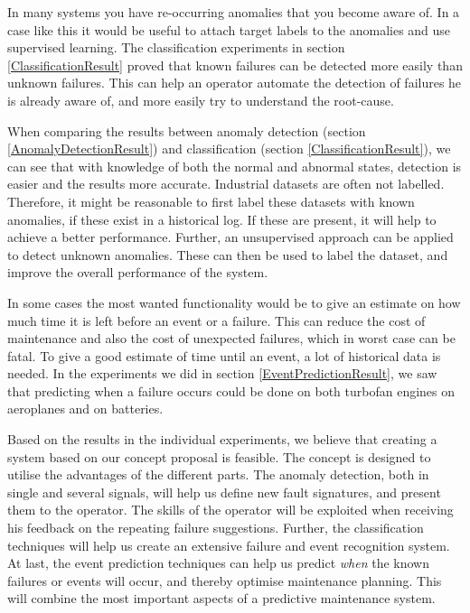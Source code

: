 \documentclass[english, a4paper]{report}
\begin{document}
{{        \par 
        In many systems you have re-occurring anomalies that you become aware of. In a case like this it would be useful to attach target labels to the anomalies and use supervised learning. The classification experiments in section \ref{ClassificationResult} proved that known failures can be detected more easily than unknown failures. This can help an operator automate the detection of failures he is already aware of, and more easily try to understand the root-cause. 
        \par 
        When comparing the results between anomaly detection (section \ref{AnomalyDetectionResult}) and classification (section \ref{ClassificationResult}), we can see that with knowledge of both the normal and abnormal states, detection is easier and the results more accurate. Industrial datasets are often not labelled. Therefore, it might be reasonable to first label these datasets with known anomalies, if these exist in a historical log. If these are present, it will help to achieve a better performance.  Further, an unsupervised approach can be applied to detect unknown anomalies. These can then be used to label the dataset, and improve the overall performance of the system.
        \par
        In some cases the most wanted functionality would be to give an estimate on how much time it is left before an event or a failure. This can reduce the cost of maintenance and also the cost of unexpected failures, which in worst case can be fatal. To give a good estimate of time until an event, a lot of historical data is needed. In the experiments we did in section \ref{EventPredictionResult}, we saw that predicting when a failure occurs could be done on both turbofan engines on aeroplanes and on batteries. 
        \par 
        
        Based on the results in the individual experiments, we believe that creating a system based on our concept proposal is feasible. The concept is designed to utilise the advantages of the different parts. The anomaly detection, both in single and several signals, will help us define new fault signatures, and present them to the operator. The skills of the operator will be exploited when receiving his feedback on the repeating failure suggestions. Further, the classification techniques will help us create an extensive failure and event recognition system. At last, the event prediction techniques can help us predict \textit{when} the known failures or events will occur, and thereby optimise maintenance planning. This will combine the most important aspects of a predictive maintenance system.
        
}}
\end{document}
